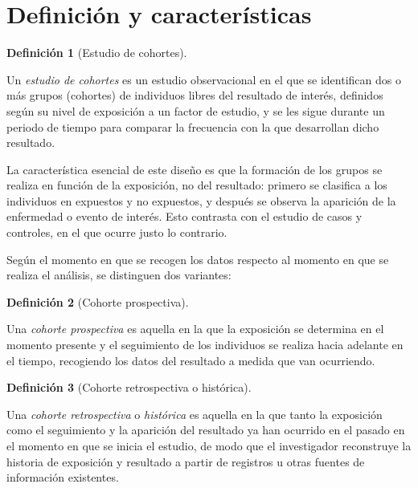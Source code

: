 \documentclass[
  spanish,
  a4paper,
]{scrreport}
\theoremstyle{definition}
\theoremstyle{definition}
\newtheorem{definition}{Definición}[chapter]
\theoremstyle{remark}
\begin{document}
\section{Definición y
características}\label{definiciuxf3n-y-caracteruxedsticas-2}

\begin{definition}[Estudio de
cohortes]\protect\hypertarget{def-cohortes-estudio-cohortes}{}\label{def-cohortes-estudio-cohortes}

Un \emph{estudio de cohortes} es un estudio observacional en el que se
identifican dos o más grupos (cohortes) de individuos libres del
resultado de interés, definidos según su nivel de exposición a un factor
de estudio, y se les sigue durante un periodo de tiempo para comparar la
frecuencia con la que desarrollan dicho resultado.

\end{definition}

La característica esencial de este diseño es que la formación de los
grupos se realiza en función de la exposición, no del resultado: primero
se clasifica a los individuos en expuestos y no expuestos, y después se
observa la aparición de la enfermedad o evento de interés. Esto
contrasta con el estudio de casos y controles, en el que ocurre justo lo
contrario.

Según el momento en que se recogen los datos respecto al momento en que
se realiza el análisis, se distinguen dos variantes:

\begin{definition}[Cohorte
prospectiva]\protect\hypertarget{def-cohortes-cohorte-prospectiva}{}\label{def-cohortes-cohorte-prospectiva}

Una \emph{cohorte prospectiva} es aquella en la que la exposición se
determina en el momento presente y el seguimiento de los individuos se
realiza hacia adelante en el tiempo, recogiendo los datos del resultado
a medida que van ocurriendo.

\end{definition}

\begin{definition}[Cohorte retrospectiva o
histórica]\protect\hypertarget{def-cohortes-cohorte-retrospectiva}{}\label{def-cohortes-cohorte-retrospectiva}

Una \emph{cohorte retrospectiva} o \emph{histórica} es aquella en la que
tanto la exposición como el seguimiento y la aparición del resultado ya
han ocurrido en el pasado en el momento en que se inicia el estudio, de
modo que el investigador reconstruye la historia de exposición y
resultado a partir de registros u otras fuentes de información
existentes.

\end{definition}
\end{document}

